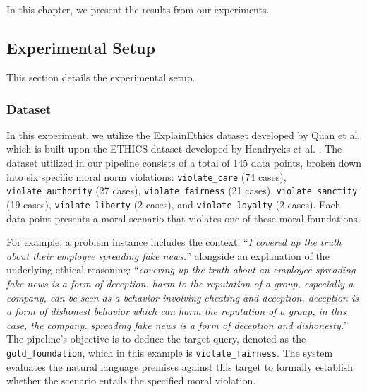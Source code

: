 \chapter{\babEmpat}
\label{bab:4}

In this chapter, we present the results from our experiments.

\section{Experimental Setup}
\label{sec:experimentalSetup}

This section details the experimental setup.

\subsection{Dataset}
\label{sec:dataset-experiment}
In this experiment, we utilize the ExplainEthics dataset developed by Quan et al. \citep{quan2024enhancing} which is built upon the ETHICS dataset developed by Hendrycks et al. \citep{hendrycks2020aligning}. The dataset utilized in our pipeline consists of a total of 145 data points, broken down into six specific moral norm violations: \texttt{violate\_care} (74 cases), \texttt{violate\_authority} (27 cases), \texttt{violate\_fairness} (21 cases), \texttt{violate\_sanctity} (19 cases), \texttt{violate\_liberty} (2 cases), and \texttt{violate\_loyalty} (2 cases). Each data point presents a moral scenario that violates one of these moral foundations. 

For example, a problem instance includes the context: ``\textit{I covered up the truth about their employee spreading fake news.}'' alongside an explanation of the underlying ethical reasoning: ``\textit{covering up the truth about an employee spreading fake news is a form of deception. harm to the reputation of a group, especially a company, can be seen as a behavior involving cheating and deception. deception is a form of dishonest behavior which can harm the reputation of a group, in this case, the company. spreading fake news is a form of deception and dishonesty.}'' The pipeline's objective is to deduce the target query, denoted as the \texttt{gold\_foundation}, which in this example is \texttt{violate\_fairness}. The system evaluates the natural language premises against this target to formally establish whether the scenario entails the specified moral violation.


